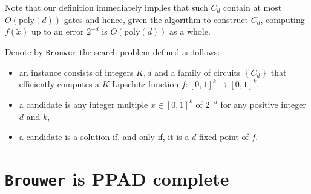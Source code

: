 \documentclass{article}
\begin{document}
Note that our definition immediately implies that such $C_d$ contain
at most $O(\text{poly}(d))$ gates and hence, given the algorithm to
construct $C_d$, computing $f(\tilde x)$ up to an error $2^{-d}$ is
$O(\text{poly}(d))$ as a whole.

\begin{definition}
  Denote by $\texttt{Brouwer}$ the search problem defined as follows:
  \begin{itemize}
    \item an instance consists of integers $K,d$ and a family of
      circuits $\left\lbrace{C_d}\right\rbrace$ that
      efficiently computes a $K$-Lipschitz function $f:\left[{0,1}\right]^k\to\left[{0,1}\right]^k$,
    \item a candidate is any integer multiple $\tilde x\in\left[{0,1}\right]^k$ of $2^{-d}$ for any positive integer $d$ and $k$,
    \item a candidate is a solution if, and only if, it is a
      $d$-fixed point of $f$. 
  \end{itemize}
\end{definition}

\section{\texttt{Brouwer} is PPAD complete}
\end{document}
